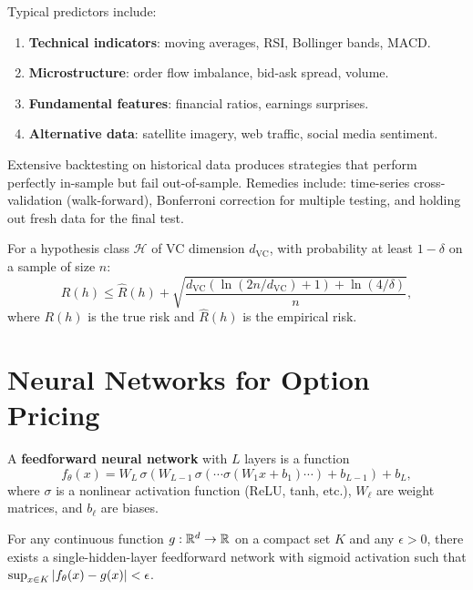 \begin{proposition}
Typical predictors include:
\begin{enumerate}
    \item \textbf{Technical indicators}: moving averages, RSI, Bollinger bands,
    MACD.
    \item \textbf{Microstructure}: order flow imbalance, bid-ask spread, volume.
    \item \textbf{Fundamental features}: financial ratios, earnings surprises.
    \item \textbf{Alternative data}: satellite imagery, web traffic, social
    media sentiment.
\end{enumerate}
\end{proposition}

\begin{attention}[title=\textbf{Overfitting and data snooping}]
Extensive backtesting on historical data produces strategies that perform
perfectly in-sample but fail out-of-sample. Remedies include: time-series
cross-validation (walk-forward), Bonferroni correction for multiple testing,
and holding out fresh data for the final test.
\end{attention}

\begin{theorem}
For a hypothesis class $\mathcal{H}$ of VC dimension $d_{\mathrm{VC}}$, with
probability at least $1 - \delta$ on a sample of size $n$:
\[
    R(h) \leq \hat{R}(h) + \sqrt{\frac{d_{\mathrm{VC}}(\ln(2n/d_{\mathrm{VC}}) + 1)
    + \ln(4/\delta)}{n}},
\]
where $R(h)$ is the true risk and $\hat{R}(h)$ is the empirical risk.
\end{theorem}

\section{Neural Networks for Option Pricing}

\begin{definition}
A \textbf{feedforward neural network} with $L$ layers is a function
\[
    f_\theta(x) = W_L\,\sigma(W_{L-1}\,\sigma(\cdots\sigma(W_1 x + b_1)\cdots)
    + b_{L-1}) + b_L,
\]
where $\sigma$ is a nonlinear activation function (ReLU, tanh, etc.),
$W_\ell$ are weight matrices, and $b_\ell$ are biases.
\end{definition}

\begin{theorem}
For any continuous function $g : \mathbb{R}^d \to \mathbb{R}$ on a compact set $K$ and any
$\epsilon > 0$, there exists a single-hidden-layer feedforward network with
sigmoid activation such that
$\sup_{x \in K}\left| f_\theta(x) - g(x) \right| < \epsilon$.
\end{theorem}

